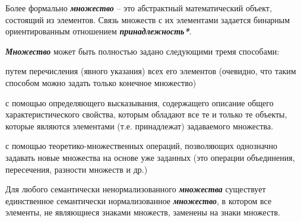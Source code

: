 Более формально \textbf{\textit{множество}} – это абстрактный математический объект, состоящий из элементов. Связь множеств с их элементами задается бинарным ориентированным отношением \textbf{\textit{принадлежность*}}.

\textbf{\textit{Множество}} может быть полностью задано следующими тремя способами:

\begin{textitemize}
	\item путем перечисления (явного указания) всех его элементов (очевидно, что таким способом можно задать только конечное множество)
	\item с помощью определяющего высказывания, содержащего описание общего характеристического свойства, которым обладают все те и только те объекты, которые являются элементами (т.е. принадлежат) задаваемого множества.
	\item с помощью теоретико-множественных операций, позволяющих однозначно задавать новые множества на основе уже заданных (это операции объединения, пересечения, разности множеств и др.)
\end{textitemize}

Для любого семантически ненормализованного \textbf{\textit{множества}} существует единственное семантически нормализованное \textbf{\textit{множество}}, в котором все элементы, не являющиеся знаками множеств, заменены на знаки множеств.

